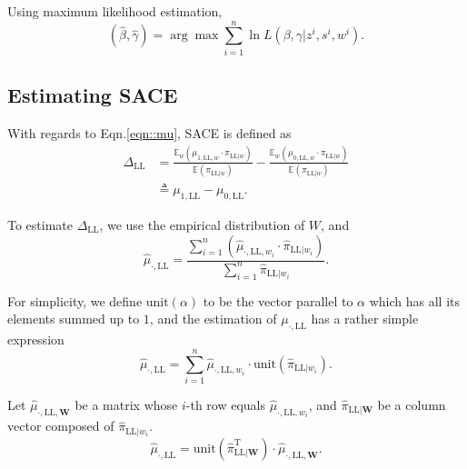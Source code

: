 \documentclass[article]{jss}
\newcommand{\transpose}[1]{#1^{\mathrm{T}}}
\begin{document}
Using maximum likelihood estimation,
\begin{equation}
  (\widehat\beta,\widehat\gamma) = \arg\max\sum_{i=1}^n\ln L(\beta,\gamma|z^i,s^i,w^i).
\end{equation}

\subsection{Estimating SACE}

With regards to Eqn.\ref{eqn::mu}, SACE is defined as
\begin{equation}
  \begin{aligned}
  \Delta_{\text{LL}} &= \frac{\mathbb{E}_w(\mu_{1,\text{LL},w}\cdot\pi_{\text{LL}|w})}{\mathbb{E}(\pi_{\text{LL}|w})}- \frac{\mathbb{E}_w(\mu_{0,\text{LL},w}\cdot\pi_{\text{LL}|w})}{\mathbb{E}(\pi_{\text{LL}|w})}\\
  &\triangleq \mu_{1,\text{LL}}-\mu_{0,\text{LL}}.
  \end{aligned}
\end{equation}

To estimate $\Delta_{\text{LL}}$, we use the empirical distribution of $W$, and
\begin{equation}
  \widehat{\mu}_{\cdot,\text{LL}} = \frac{\sum_{i=1}^n(\hat{\mu}_{\cdot,\text{LL},w_i}\cdot\widehat{\pi}_{\text{LL}|w_i})}{\sum_{i=1}^n\widehat{\pi}_{\text{LL}|w_i}}.
\end{equation}

For simplicity, we define $\mathrm{unit}(\alpha)$ to be the vector parallel to $\alpha$ which has all its elements summed up to $1$, and the estimation of $\mu_{\cdot,\text{LL}}$ has a rather simple expression
\begin{equation}
  \widehat{\mu}_{\cdot,\text{LL}}=\sum_{i=1}^n\widehat{\mu}_{\cdot,\text{LL},w_i}\cdot\mathrm{unit}\left(\widehat{\pi}_{\text{LL}|w_i}\right).
\end{equation}

Let $\widehat{\mu}_{\cdot,\text{LL},\mathbf{W}}$ be a matrix whose $i$-th row equals $\widehat{\mu}_{\cdot,\text{LL},w_i}$, and $\widehat{\pi}_{\text{LL}|\mathbf{W}}$ be a column vector composed of $\widehat{\pi}_{\text{LL}|w_i}$.
\begin{equation}
  \widehat{\mu}_{\cdot,\text{LL}} = \mathrm{unit}(\transpose{\widehat{\pi}_{\text{LL}|\mathbf{W}}})\cdot\widehat{\mu}_{\cdot,\text{LL},\mathbf{W}}.
\end{equation}
\end{document}
